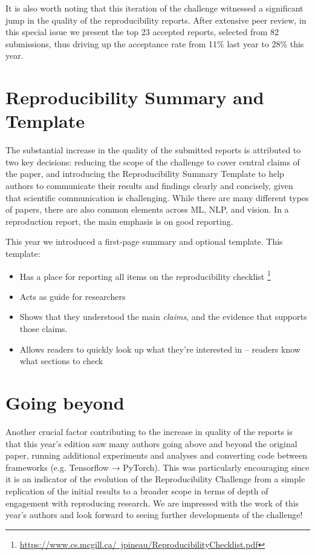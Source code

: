 It is also worth noting that this iteration of the challenge witnessed a significant jump in the quality of the reproducibility reports. After extensive peer review, in this special issue we present the top 23 accepted reports, selected from 82 submissions, thus driving up the acceptance rate from 11\% last year to 28\% this year.

\section{Reproducibility Summary and Template}

The substantial increase in the quality of the submitted reports is attributed to two key decisions: reducing the scope of the challenge to cover central claims of the paper, and introducing the Reproducibility Summary Template to help authors to communicate their results and findings clearly and concisely, given that scientific communication is challenging. While there are many different types of papers, there are also common elements across ML, NLP, and vision. In a reproduction report, the main emphasis is on good reporting.

This year we introduced a first-page summary and optional template. This template:
\begin{itemize}
  \item Has a place for reporting all items on the reproducibility checklist \footnote{\href{https://www.cs.mcgill.ca/~jpineau/ReproducibilityChecklist.pdf}{https://www.cs.mcgill.ca/~jpineau/ReproducibilityChecklist.pdf}}
  \item Acts as guide for researchers
  \item Shows that they understood the main \textit{claims}, and the evidence that supports those claims.
  \item Allows readers to quickly look up what they're interested in -- readers know what sections to check
\end{itemize}

\section{Going beyond}

Another crucial factor contributing to the increase in quality of the reports is that this year’s edition saw many authors going above and beyond the original paper, running additional experiments and analyses and converting code between frameworks (e.g. Tensorflow → PyTorch). This was particularly encouraging since it is an indicator of the evolution of the Reproducibility Challenge from a simple replication of the initial results to a broader scope in terms of depth of engagement with reproducing research. We are impressed with the work of this year’s authors and look forward to seeing further developments of the challenge!


